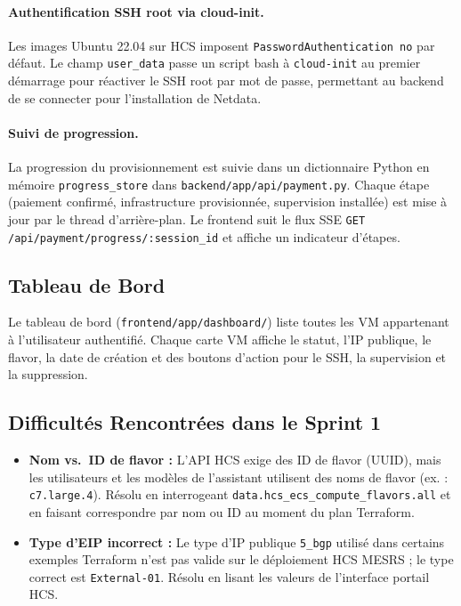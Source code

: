 \paragraph{Authentification SSH root via cloud-init.}
Les images Ubuntu 22.04 sur HCS imposent \texttt{PasswordAuthentication no} par
défaut. Le champ \texttt{user\_data} passe un script bash à \texttt{cloud-init} au
premier démarrage pour réactiver le SSH root par mot de passe, permettant au backend
de se connecter pour l'installation de Netdata.

\paragraph{Suivi de progression.}
La progression du provisionnement est suivie dans un dictionnaire Python en mémoire
\texttt{progress\_store} dans \texttt{backend/app/api/payment.py}. Chaque étape
(paiement confirmé, infrastructure provisionnée, supervision installée) est mise à
jour par le thread d'arrière-plan. Le frontend suit le flux SSE
\texttt{GET /api/payment/progress/:session\_id} et affiche un indicateur d'étapes.


\subsection{Tableau de Bord}

Le tableau de bord (\texttt{frontend/app/dashboard/}) liste toutes les VM appartenant
à l'utilisateur authentifié. Chaque carte VM affiche le statut, l'IP publique, le
flavor, la date de création et des boutons d'action pour le SSH, la supervision et
la suppression.


\subsection{Difficultés Rencontrées dans le Sprint 1}

\begin{itemize}
  \item \textbf{Nom vs.\ ID de flavor :} L'API HCS exige des ID de flavor (UUID), mais
        les utilisateurs et les modèles de l'assistant utilisent des noms de flavor
        (ex. : \texttt{c7.large.4}). Résolu en interrogeant
        \texttt{data.hcs\_ecs\_compute\_flavors.all} et en faisant correspondre par
        nom ou ID au moment du plan Terraform.
  \item \textbf{Type d'EIP incorrect :} Le type d'IP publique \texttt{5\_bgp} utilisé
        dans certains exemples Terraform n'est pas valide sur le déploiement HCS MESRS ;
        le type correct est \texttt{External-01}. Résolu en lisant les valeurs de
        l'interface portail HCS.
\end{itemize}


